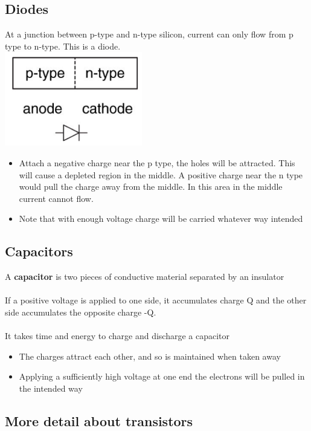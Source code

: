 \documentclass{article}[18pt]
\begin{document}
\subsection{Diodes}
At a junction between p-type and n-type silicon, current can only flow from p type to n-type. This is a diode.\\
\includegraphics[width=6cm]{Fig3.png}
\begin{itemize}
\item Attach a negative charge near the p type, the holes will be attracted. This will cause a depleted region in the middle. A positive charge near the n type would pull the charge away from the middle. In this area in the middle current cannot flow.
\item Note that with enough voltage charge will be carried whatever way intended
\end{itemize}
\subsection{Capacitors}
A \textbf{capacitor} is two pieces of conductive material separated by an insulator\\
\\
If a positive voltage is applied to one side, it accumulates charge Q and the other side accumulates the opposite charge -Q.\\
\\
It takes time and energy to charge and discharge a capacitor
\begin{itemize}
\item The charges attract each other, and so is maintained when taken away
\item Applying a sufficiently high voltage at one end the electrons will be pulled in the intended way
\end{itemize}
\subsection{More detail about transistors}
\end{document}
